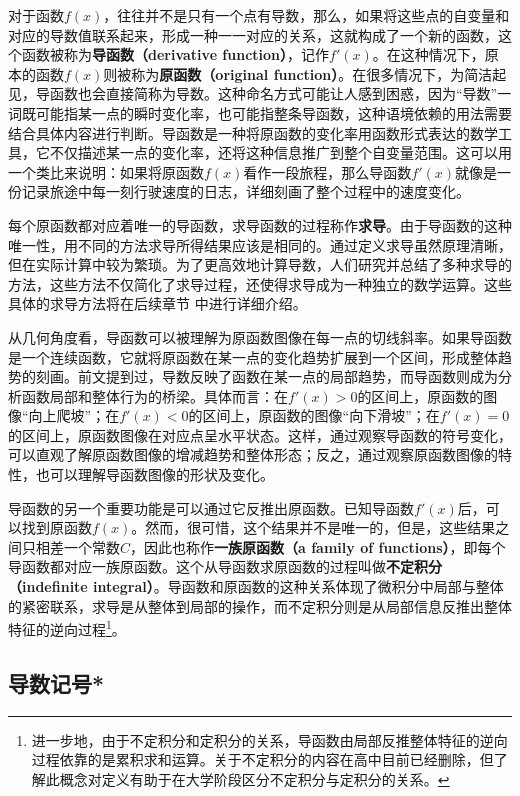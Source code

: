 对于函数$f(x)$，往往并不是只有一个点有导数，那么，如果将这些点的自变量和对应的导数值联系起来，形成一种一一对应的关系，这就构成了一个新的函数，这个函数被称为\textbf{导函数（derivative function）}，记作$f'(x)$。在这种情况下，原本的函数$f(x)$则被称为\textbf{原函数（original function）}。在很多情况下，为简洁起见，导函数也会直接简称为导数。这种命名方式可能让人感到困惑，因为“导数”一词既可能指某一点的瞬时变化率，也可能指整条导函数，这种语境依赖的用法需要结合具体内容进行判断。导函数是一种将原函数的变化率用函数形式表达的数学工具，它不仅描述某一点的变化率，还将这种信息推广到整个自变量范围。这可以用一个类比来说明：如果将原函数$f(x)$看作一段旅程，那么导函数$f'(x)$就像是一份记录旅途中每一刻行驶速度的日志，详细刻画了整个过程中的速度变化。

每个原函数都对应着唯一的导函数，求导函数的过程称作\textbf{求导}。由于导函数的这种唯一性，用不同的方法求导所得结果应该是相同的。通过定义求导虽然原理清晰，但在实际计算中较为繁琐。为了更高效地计算导数，人们研究并总结了多种求导的方法，这些方法不仅简化了求导过程，还使得求导成为一种独立的数学运算。这些具体的求导方法将在后续章节  中进行详细介绍。

从几何角度看，导函数可以被理解为原函数图像在每一点的切线斜率。如果导函数是一个连续函数，它就将原函数在某一点的变化趋势扩展到一个区间，形成整体趋势的刻画。前文提到过，导数反映了函数在某一点的局部趋势，而导函数则成为分析函数局部和整体行为的桥梁。具体而言：在$f'(x) > 0$的区间上，原函数的图像“向上爬坡”；在$f'(x) < 0$的区间上，原函数的图像“向下滑坡”；在$f'(x) = 0$的区间上，原函数图像在对应点呈水平状态。这样，通过观察导函数的符号变化，可以直观了解原函数图像的增减趋势和整体形态；反之，通过观察原函数图像的特性，也可以理解导函数图像的形状及变化。

导函数的另一个重要功能是可以通过它反推出原函数。已知导函数$f'(x)$后，可以找到原函数$f(x)$。然而，很可惜，这个结果并不是唯一的，但是，这些结果之间只相差一个常数$C$，因此也称作\textbf{一族原函数（a family of functions）}，即每个导函数都对应一族原函数。这个从导函数求原函数的过程叫做\textbf{不定积分（indefinite integral）}。导函数和原函数的这种关系体现了微积分中局部与整体的紧密联系，求导是从整体到局部的操作，而不定积分则是从局部信息反推出整体特征的逆向过程\footnote{进一步地，由于不定积分和定积分的关系，导函数由局部反推整体特征的逆向过程依靠的是累积求和运算。关于不定积分的内容在高中目前已经删除，但了解此概念对定义有助于在大学阶段区分不定积分与定积分的关系。}。

\subsection{导数记号*}

